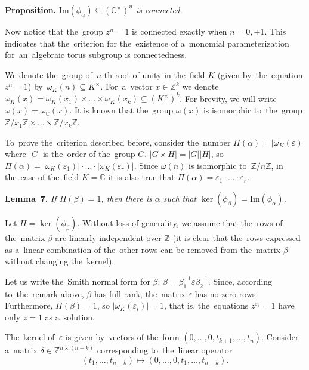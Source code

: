 \documentclass[twoside]{article}
\begin{document}
\medskip\noindent\textbf{Proposition.}\emph{
    $\mathrm{Im}(\phi_\alpha) \subseteq (\mathbb{C}^\times)^n$ is connected.
}\medskip

Now notice that the~group $z^n = 1$ is connected exactly when $n = 0, \pm 1$.
This indicates that the~criterion for the~existence of a~monomial parameterization
for~an~algebraic torus subgroup is connectedness.

We denote the~group of~$n$-th root of unity in the~field $K$ (given by~the~equation $z^n = 1$) by~$\omega_K(n) \subseteq K^\times$.
For~a~vector $x \in \mathbb{Z}^k$ we denote $\omega_K(x) = \omega_K(x_1) \times \ldots \times \omega_K(x_k) \subseteq (K^\times)^k$.
For brevity, we will write $\omega(x) = \omega_\mathbb{C}(x)$. It is known that the~group $\omega(x)$ is isomorphic
to~the~group $\mathbb{Z} / x_1 \mathbb{Z} \times \ldots \times \mathbb{Z} / x_k \mathbb{Z}$.

To~prove the~criterion described before, consider the~number $\Pi(\alpha) = |\omega_K(\varepsilon)|$
where $|G|$ is the~order of the~group $G$. $|G \times H| = |G| |H|$, so $\Pi(\alpha) = |\omega_K(\varepsilon_1)| \cdot \ldots \cdot |\omega_K(\varepsilon_r)|$.
Since $\omega(n)$ is isomorphic to~$\mathbb{Z} / n \mathbb{Z}$, in the~case of the~field $K = \mathbb{C}$ it is also true that
$\Pi(\alpha) = \varepsilon_1 \cdot \ldots \cdot \varepsilon_r$.

\medskip\noindent\textbf{Lemma~7.}\emph{
    If $\Pi(\beta) = 1$, then there is $\alpha$ such that $\ker(\phi_\beta) = \mathrm{Im}(\phi_\alpha)$.
}\medskip

    Let $H = \ker(\phi_\beta)$. Without loss of generality, we assume that the~rows of the~matrix $\beta$ are linearly independent
    over $\mathbb{Z}$ (it is clear that the~rows expressed as a~linear combination of the~other rows can be removed from the~matrix $\beta$
    without changing the~kernel).

    Let us write the~Smith normal form for $\beta$: $\beta = \beta_1^{-1} \varepsilon \beta_2^{-1}$.
    Since, according to~the~remark above, $\beta$ has full rank, the~matrix $\varepsilon$ has no zero rows.
    Furthermore, $\Pi(\beta) = 1$, so $|\omega_K(\varepsilon_i)| = 1$, that is, the~equations $z^{\varepsilon_i} = 1$
    have only $z = 1$ as a~solution.

    The~kernel of~$\varepsilon$ is given by~vectors of the~form $(0,\allowbreak \ldots,\allowbreak 0,\allowbreak t_{k + 1},\allowbreak \ldots, t_{n})$.
    Consider a~matrix $\delta \in \mathbb{Z}^{n \times (n - k)}$ corresponding to~the~linear operator
    $$
        (t_1, \ldots, t_{n - k}) \mapsto (0, \ldots, 0, t_1, \ldots, t_{n - k}).
    $$
\end{document}
